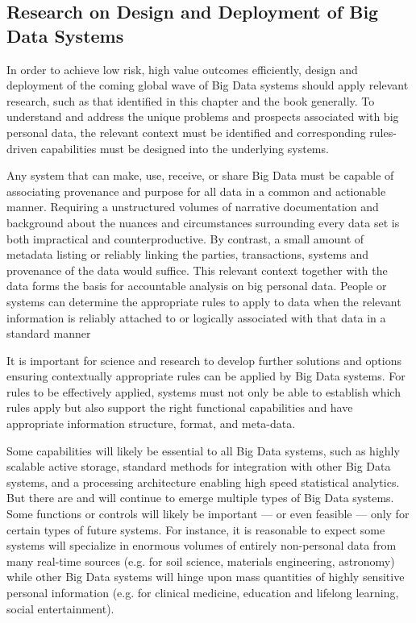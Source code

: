 \subsection{Research on Design and Deployment of Big Data Systems}

In order to achieve low risk, high value outcomes efficiently, design and deployment of the coming global wave of Big Data systems should apply relevant research, such as that identified in this chapter and the book generally.
To understand and address the unique problems and prospects associated with big personal data, the relevant context must be identified and corresponding rules-driven capabilities must be designed into the underlying systems.

Any system that can make, use, receive, or share Big Data must be capable of associating provenance and purpose for all data in a common and actionable manner.
Requiring a unstructured volumes of narrative documentation and background about the nuances and circumstances surrounding every data set is both impractical and counterproductive.
By contrast, a small amount of metadata listing or reliably linking the parties, transactions, systems and provenance of the data would suffice.
This relevant context together with the data forms the basis for accountable analysis on big personal data.  People or systems can determine the appropriate rules to apply to data when the relevant information is reliably attached to or logically associated with that data in a standard manner 

It is important for science and research to develop further solutions and options ensuring contextually appropriate rules can be applied by Big Data systems.
For rules to be effectively applied, systems must not only be able to establish which rules apply but also support the right functional capabilities and have appropriate information structure, format, and meta-data.

Some capabilities will likely be essential to all Big Data systems, such as highly scalable active storage, standard methods for integration with other Big Data systems, and a processing architecture enabling high speed statistical analytics.
But there are and will continue to emerge multiple types of Big Data systems.
Some functions or controls will likely be important --- or even feasible --- only for certain types of future systems.
For instance, it is reasonable to expect some systems will specialize in enormous volumes of entirely non-personal data from many real-time sources (e.g. for soil science, materials engineering, astronomy) while other Big Data systems will hinge upon mass quantities of highly sensitive personal information (e.g. for clinical medicine, education and lifelong learning, social entertainment).

